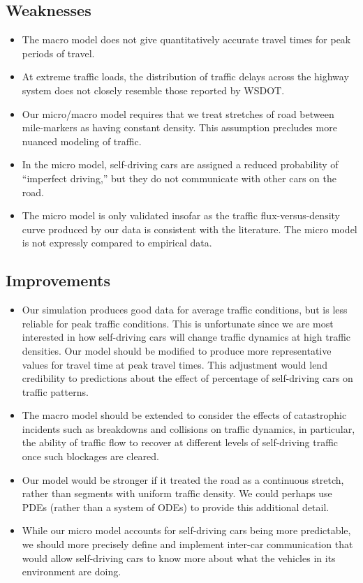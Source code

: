\subsection{Weaknesses}
    \begin{itemize}
        \item The macro model does not give quantitatively accurate travel times for peak periods of travel.
        \item At extreme traffic loads, the distribution of traffic delays across the highway system does not closely resemble those reported by WSDOT.
        \item Our micro/macro model requires that we treat stretches of road between mile-markers as having constant density.  This assumption precludes more nuanced modeling of traffic.
        \item In the micro model, self-driving cars are assigned a reduced probability of ``imperfect driving,'' but they do not communicate with other cars on the road.
        \item The micro model is only validated insofar as the traffic flux-versus-density curve produced by our data is consistent with the literature.  The micro model is not expressly compared to empirical data.
    \end{itemize}
\subsection{Improvements}
    \begin{itemize}
        \item Our simulation produces good data for average traffic conditions, but is less reliable for peak traffic conditions.  This is unfortunate since we are most interested in how self-driving cars will change traffic dynamics at high traffic densities.  Our model should be modified to produce more representative values for travel time at peak travel times.  This adjustment would lend credibility to predictions about the effect of percentage of self-driving cars on traffic patterns. 
        \item The macro model should be extended to consider the effects of catastrophic incidents such as breakdowns and collisions on traffic dynamics, in particular, the ability of traffic flow to recover at different levels of self-driving traffic once such blockages are cleared.
        \item Our model would be stronger if it treated the road as a continuous stretch, rather than segments with uniform traffic density.  We could perhaps use PDEs (rather than a system of ODEs) to provide this additional detail.
        \item While our micro model accounts for self-driving cars being more predictable, we should more precisely define and implement inter-car communication that would allow self-driving cars to know more about what the vehicles in its environment are doing.
    \end{itemize}